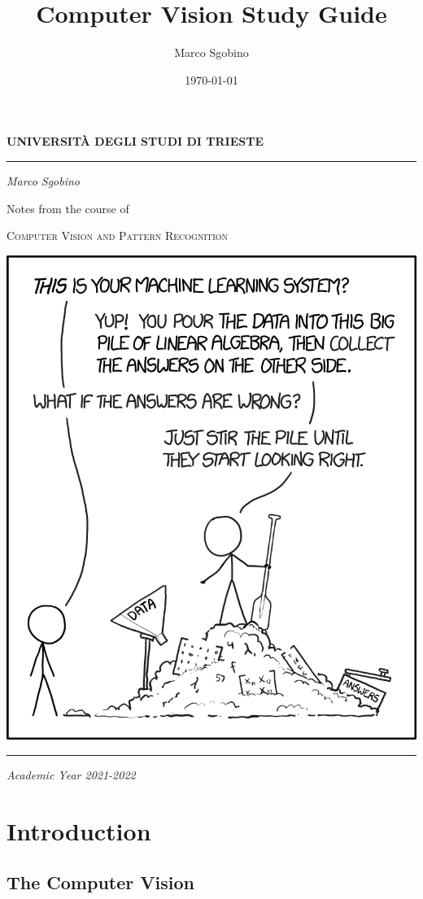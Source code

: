 \documentclass[10pt]{report}
\author{Marco Sgobino}
\date{\today}
\title{Computer Vision Study Guide}
\begin{document}
\begin{titlepage}
\begin{center}
\Large
\textbf{UNIVERSITÀ DEGLI STUDI DI TRIESTE}
\par\noindent\rule{\textwidth}{1.8pt}
\vspace*{0.6cm}
\large

\emph{Marco Sgobino}

\large
\vspace*{0.6cm}
\Large Notes from the course of

\vspace*{0.6cm}
\Huge
\textsc{Computer Vision and Pattern Recognition}

\vspace*{.1cm}
\vspace*{2cm}
\begin{center}
\includegraphics[width=.6\textwidth, keepaspectratio]{./pics/cv-titlepage.png}
\end{center}
\vfill
\par\noindent\rule{\textwidth}{1.8pt}
\vspace*{0.6cm}
\large
\emph{Academic Year 2021-2022}
\end{center}
\end{titlepage}
\tableofcontents


\part{Introduction}
\label{sec:org5a265cc}
\setlength{\headsep}{30pt}
\setlength{\footskip}{40pt}
\setlength{\marginparsep}{20pt}
\setlength{\marginparwidth}{60pt}
\chapter{The Computer Vision}
\label{the-computer-vision}
\end{document}

